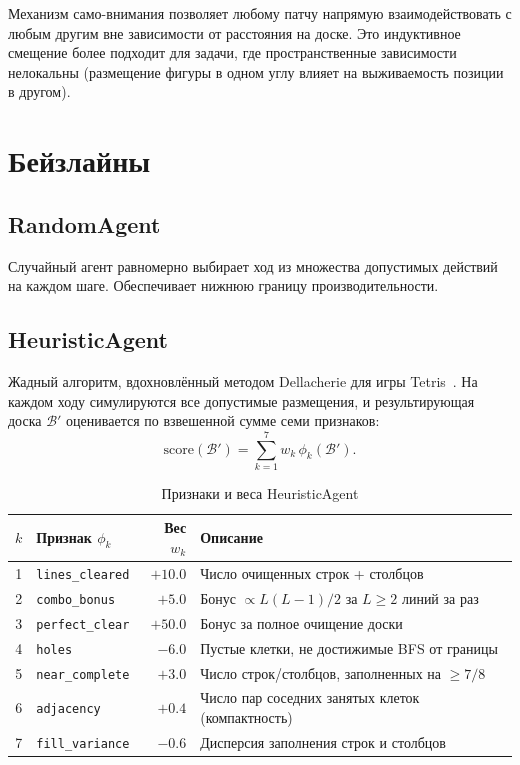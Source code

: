 \documentclass[12pt, a4paper]{article}
\begin{document}
Механизм само-внимания позволяет любому патчу напрямую взаимодействовать с любым другим вне зависимости от расстояния на доске. Это индуктивное смещение более подходит для задачи, где пространственные зависимости нелокальны (размещение фигуры в одном углу влияет на выживаемость позиции в другом).

\section{Бейзлайны}

\subsection{RandomAgent}

Случайный агент равномерно выбирает ход из множества допустимых действий на каждом шаге. Обеспечивает нижнюю границу производительности.

\subsection{HeuristicAgent}

Жадный алгоритм, вдохновлённый методом Dellacherie для игры Tetris~\cite{dellacherie2003}. На каждом ходу симулируются все допустимые размещения, и результирующая доска $\mathcal{B}'$ оценивается по взвешенной сумме семи признаков:
\begin{equation}
  \text{score}(\mathcal{B}') = \sum_{k=1}^{7} w_k\, \phi_k(\mathcal{B}').
\end{equation}

\begin{table}[H]
  \centering
  \caption{Признаки и веса HeuristicAgent}
  \label{tab:heuristic}
  \small
  \begin{tabular}{clrl}
    \toprule
    $k$ & \textbf{Признак} $\phi_k$ & \textbf{Вес} $w_k$ & \textbf{Описание} \\
    \midrule
    1 & \texttt{lines\_cleared}  & $+10.0$ & Число очищенных строк + столбцов \\
    2 & \texttt{combo\_bonus}    & $+5.0$  & Бонус $\propto L(L{-}1)/2$ за $L\geq2$ линий за раз \\
    3 & \texttt{perfect\_clear}  & $+50.0$ & Бонус за полное очищение доски \\
    4 & \texttt{holes}           & $-6.0$  & Пустые клетки, не достижимые BFS от границы \\
    5 & \texttt{near\_complete}  & $+3.0$  & Число строк/столбцов, заполненных на $\geq7/8$ \\
    6 & \texttt{adjacency}       & $+0.4$  & Число пар соседних занятых клеток (компактность) \\
    7 & \texttt{fill\_variance}  & $-0.6$  & Дисперсия заполнения строк и столбцов \\
    \bottomrule
  \end{tabular}
\end{table}
\end{document}
